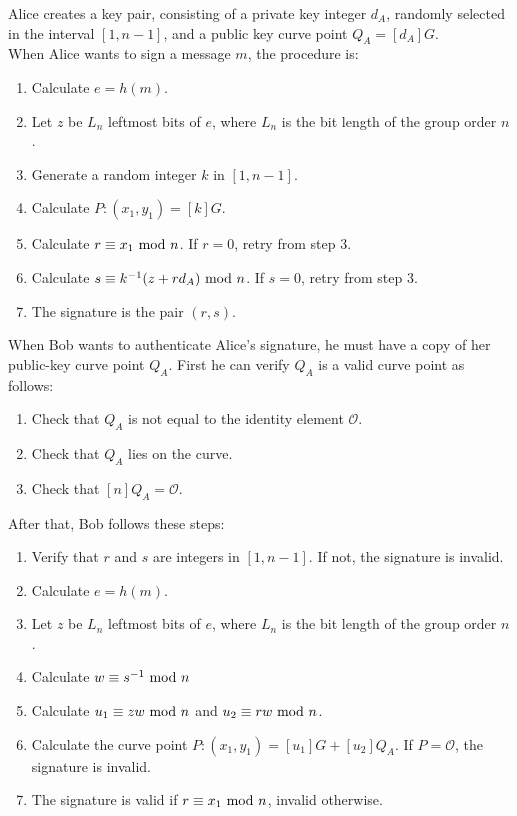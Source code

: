 \documentclass{article}
\renewcommand{\mod}{{\rm\ mod\ }}
\begin{document}
Alice creates a key pair, consisting of a private key integer $d_{A}$, randomly selected in the interval $[1,n-1]$, and a public key curve point $Q_A=[d_A]G$.\\

When Alice wants to sign a message $m$, the procedure is:
\begin{enumerate}
\item Calculate $e=h(m)$.
\item Let $z$ be $L_n$ leftmost bits of $e$, where $L_n$ is the  bit length of the group order $n$.
\item Generate a random integer $k$ in $[1,n-1]$.
\item Calculate $P:(x_1,y_1)=[k]G$.
\item Calculate $r\equiv x_1\mod n$. If $r=0$, retry from step 3.
\item Calculate $s\equiv k^{-1}(z+rd_A)\mod n$. If $s=0$, retry from step 3.
\item The signature is the pair $(r,s)$.
\end{enumerate}

When Bob wants to authenticate Alice's signature, he must have a copy of her public-key curve point $Q_A$. First he can verify $Q_A$ is a valid curve point as follows:

\begin{enumerate}
\item Check that $Q_{A}$ is not equal to the identity element $\mathcal{O}$.
\item Check that $Q_{A}$ lies on the curve.
\item Check that $[n]Q_{A}=\mathcal{O}$.
\end{enumerate}

After that, Bob follows these steps:

\begin{enumerate}
\item Verify that $r$ and $s$ are integers in $[1,n-1]$. If not, the signature is invalid.
\item Calculate $e=h(m)$.
\item Let $z$ be $L_n$ leftmost bits of $e$, where $L_n$ is the  bit length of the group order $n$.
\item Calculate $w\equiv s^{-1}\mod n$
\item Calculate $u_1\equiv zw\mod n$ and $u_2\equiv rw\mod n$.
\item Calculate the curve point $P:(x_1,y_1)=[u_1]G+[u_2]Q_A$. If $P=\mathcal{O}$, the signature is invalid.
\item The signature is valid if $r\equiv x_1\mod n$, invalid otherwise.
\end{enumerate}
\end{document}
